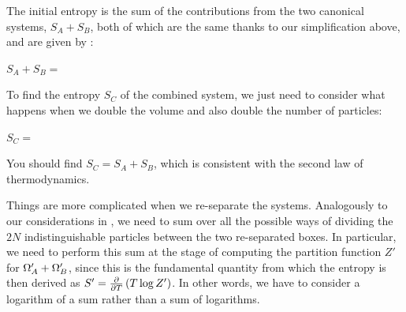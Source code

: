 \newpage %
The initial entropy is the sum of the contributions from the two canonical systems, $S_A + S_B$, both of which are the same thanks to our simplification above, and are given by :
\begin{mdframed}
  $\displaystyle S_A + S_B = $ \\[50 pt]
\end{mdframed}
To find the entropy $S_C$ of the combined system, we just need to consider what happens when we double the volume and also double the number of particles:
\begin{mdframed}
  $\displaystyle S_C = $ \\[50 pt]
\end{mdframed}
You should find $S_C = S_A + S_B$, which is consistent with the second law of thermodynamics.

Things are more complicated when we re-separate the systems.
Analogously to our considerations in , we need to sum over all the possible ways of dividing the $2N$ indistinguishable particles between the two re-separated boxes. %
In particular, we need to perform this sum at the stage of computing the partition function $Z'$ for $\Omega_A' + \Omega_B'$, since this is the fundamental quantity from which the entropy is then derived as $S' = \frac{\partial }{\partial T}\left(T\log Z'\right)$. %
In other words, we have to consider a logarithm of a sum rather than a sum of logarithms.

